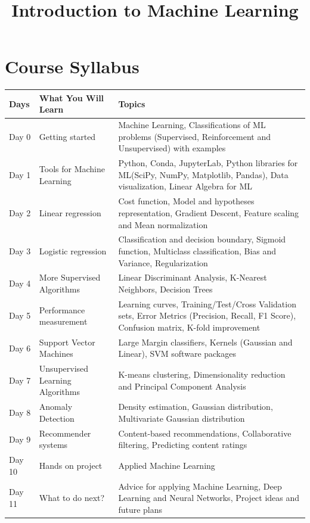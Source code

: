 \documentclass[11pt]{article}
\title{Introduction to Machine Learning}
\date{}
\begin{document}
\maketitle
\section{Course Syllabus}
\begin{center}
\begin{tabular}{|M{1.2cm}|M{4cm}|M{12cm}|}
\hline
Days & What You Will Learn&Topics\\ \hline
Day 0 &Getting started &Machine Learning, Classifications of ML problems (Supervised, Reinforcement and Unsupervised) with examples\\ \hline
Day 1 & Tools for Machine Learning &Python, Conda, JupyterLab, Python libraries for ML(SciPy, NumPy, Matplotlib, Pandas), Data visualization, Linear Algebra for ML\\ \hline
Day 2 & Linear regression &Cost function, Model and hypotheses representation, Gradient Descent, Feature scaling and Mean normalization\\ \hline
Day 3 & Logistic regression &Classification and decision boundary, Sigmoid function, Multiclass classification, Bias and Variance, Regularization\\ \hline
Day 4 &More Supervised Algorithms &Linear Discriminant Analysis, K-Nearest Neighbors, Decision Trees\\ \hline
Day 5 & Performance measurement &Learning curves, Training/Test/Cross Validation sets, Error Metrics (Precision, Recall, F1 Score), Confusion matrix, K-fold improvement\\ \hline
Day 6 &Support Vector Machines&Large Margin classifiers, Kernels (Gaussian and Linear), SVM software packages\\ \hline
Day 7 & Unsupervised Learning Algorithms & K-means clustering, Dimensionality reduction and Principal Component Analysis\\ \hline
Day 8 & Anomaly Detection& Density estimation, Gaussian distribution, Multivariate Gaussian distribution\\ \hline
Day 9 &Recommender systems & Content-based recommendations, Collaborative filtering, Predicting content ratings\\ \hline
Day 10 & Hands on project & Applied Machine Learning\\ \hline
Day 11 & What to do next? &Advice for applying Machine Learning, Deep Learning and Neural Networks, Project ideas and future plans\\ \hline
\end{tabular}
\end{center}
\end{document}
